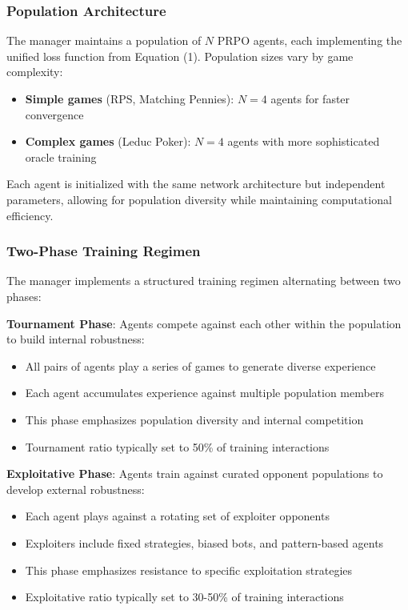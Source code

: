 \documentclass[sigconf,anonymous]{aamas}
\begin{document}
\subsubsection{Population Architecture}
The manager maintains a population of \(N\) PRPO agents, each implementing the unified loss function from Equation (1). Population sizes vary by game complexity:
\begin{itemize}
\item \textbf{Simple games} (RPS, Matching Pennies): \(N=4\) agents for faster convergence
\item \textbf{Complex games} (Leduc Poker): \(N=4\) agents with more sophisticated oracle training
\end{itemize}
Each agent is initialized with the same network architecture but independent parameters, allowing for population diversity while maintaining computational efficiency.

\subsubsection{Two-Phase Training Regimen}
The manager implements a structured training regimen alternating between two phases:

\textbf{Tournament Phase}: Agents compete against each other within the population to build internal robustness:
\begin{itemize}
\item All pairs of agents play a series of games to generate diverse experience
\item Each agent accumulates experience against multiple population members
\item This phase emphasizes population diversity and internal competition
\item Tournament ratio typically set to 50\% of training interactions
\end{itemize}

\textbf{Exploitative Phase}: Agents train against curated opponent populations to develop external robustness:
\begin{itemize}
\item Each agent plays against a rotating set of exploiter opponents
\item Exploiters include fixed strategies, biased bots, and pattern-based agents
\item This phase emphasizes resistance to specific exploitation strategies
\item Exploitative ratio typically set to 30-50\% of training interactions
\end{itemize}
\end{document}
